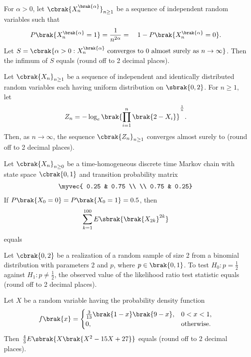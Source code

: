 \item For $\alpha > 0$, let $\cbrak{ X_n^{\brak{\alpha}} }_{n\geq1}$ be a sequence of independent random variables such that
\begin{align*}
P\brak{X_n^{\brak{\alpha}} = 1} = \frac{1}{n^{2\alpha}} = \quad 1 - P\brak{X_n^{\brak{\alpha}} = 0}.
\end{align*}
Let $S = \cbrak{ \alpha > 0 : X_n^{\brak{\alpha}} \text{ converges to 0 almost surely as } n \to \infty }$.
Then the infimum of $S$ equals \underline{\hspace{1cm}} (round off to 2 decimal places).

\item Let $\cbrak{X_n}_{n\geq1}$ be a sequence of independent and identically distributed random variables each having uniform distribution on $\sbrak{0,2}$. For $n \geq 1$, let
\begin{align*}
Z_n = - \log_e \brak{ \prod_{i=1}^{n} \brak{2 - X_i} }^{\frac{1}{n}}.
\end{align*}
Then, as $n \to \infty$, the sequence $\cbrak{Z_n}_{n\geq1}$ converges almost surely to \underline{\hspace{1cm}} (round off to 2 decimal places).


\item Let $\cbrak{X_n}_{n \geq 0}$ be a time-homogeneous discrete time Markov chain with state space $\cbrak{0,1}$ and transition probability matrix
\begin{align*}
\myvec{ 0.25 & 0.75 \\ \\
	0.75 & 0.25}
\end{align*}
If $P\brak{X_0 = 0} = P\brak{X_0 = 1} = 0.5$, then
\begin{align*}
\sum_{k=1}^{100} E \sbrak{\brak{X_{2k}}^{2k}}
\end{align*}
equals \underline{\hspace{1cm}}

\item Let $\cbrak{0,2}$ be a realization of a random sample of size 2 from a binomial distribution with parameters 2 and $p$, where $p \in \brak{0,1}$. To test $H_0: p = \frac{1}{2}$ against $H_1: p \neq \frac{1}{2}$, the observed value of the likelihood ratio test statistic equals \underline{\hspace{1cm}} (round off to 2 decimal places).

\item Let $X$ be a random variable having the probability density function
\begin{align*}
f\brak{x} = 
\begin{cases}
\frac{3}{13} \brak{1 - x} \brak{9 - x}, & 0 < x < 1, \\
0, & \text{otherwise}.
\end{cases}
\end{align*}
Then $\frac{4}{3} E \sbrak{X \brak{X^2 - 15X + 27}}$ equals \underline{\hspace{1cm}} (round off to 2 decimal places).

